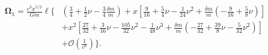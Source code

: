 \begin{align}
\label{precessionCO}
\mathbf{\Omega}_1=\frac{c^3 x^{5/2}}{Gm}\boldsymbol\ell \Bigg\{ &
\left(\frac{3}{4} + \frac{1}{2} \nu -\frac{3}{4}\frac{\delta m}{m}\right)
+x \left[\frac{9}{16} + \frac{5}{4} \nu -\frac{1}{24} \nu^2+\frac{\delta m}{m}\left(-\frac{9}{16} + \frac{5}{8} \nu\right)\right]\nonumber\\
&+x^2 \left[\frac{27}{32} + \frac{3}{16} \nu -\frac{105}{32} \nu^2 -\frac{1}{48} \nu^3+\frac{\delta m}{m}\left(-\frac{27}{32} + \frac{39}{8} \nu -\frac{5}{32} \nu^2\right)\right]\nonumber\\
&+\mathcal{O}\left(\frac{1}{c^6}\right)
\Bigg\}.
\end{align}